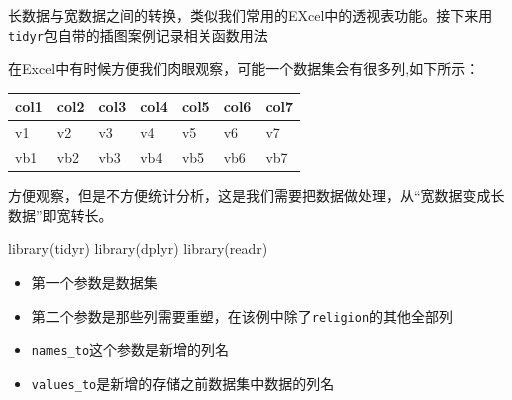 \documentclass[
]{book}
\newenvironment{Shaded}{\begin{snugshade}}{\end{snugshade}}
\newcommand{\AttributeTok}[1]{\textcolor[rgb]{0.77,0.63,0.00}{#1}}
\newcommand{\CommentTok}[1]{\textcolor[rgb]{0.56,0.35,0.01}{\textit{#1}}}
\newcommand{\FunctionTok}[1]{\textcolor[rgb]{0.00,0.00,0.00}{#1}}
\newcommand{\NormalTok}[1]{#1}
\newcommand{\SpecialCharTok}[1]{\textcolor[rgb]{0.00,0.00,0.00}{#1}}
\newcommand{\StringTok}[1]{\textcolor[rgb]{0.31,0.60,0.02}{#1}}
\providecommand{\tightlist}{%
  \setlength{\itemsep}{0pt}\setlength{\parskip}{0pt}}
\begin{document}
长数据与宽数据之间的转换，类似我们常用的EXcel中的透视表功能。接下来用\texttt{tidyr}包自带的插图案例记录相关函数用法

在Excel中有时候方便我们肉眼观察，可能一个数据集会有很多列,如下所示：

\begin{longtable}[]{@{}lllllll@{}}
\toprule
col1 & col2 & col3 & col4 & col5 & col6 & col7 \\
\midrule
\endhead
v1 & v2 & v3 & v4 & v5 & v6 & v7 \\
vb1 & vb2 & vb3 & vb4 & vb5 & vb6 & vb7 \\
\bottomrule
\end{longtable}

方便观察，但是不方便统计分析，这是我们需要把数据做处理，从``宽数据变成长数据''即宽转长。

\begin{Shaded}
\begin{Highlighting}[]
\FunctionTok{library}\NormalTok{(tidyr)}
\FunctionTok{library}\NormalTok{(dplyr)}
\FunctionTok{library}\NormalTok{(readr)}
\end{Highlighting}
\end{Shaded}

\begin{Shaded}
\end{Shaded}

\begin{itemize}
\tightlist
\item
  第一个参数是数据集
\item
  第二个参数是那些列需要重塑，在该例中除了\texttt{religion}的其他全部列
\item
  \texttt{names\_to}这个参数是新增的列名
\item
  \texttt{values\_to}是新增的存储之前数据集中数据的列名
\end{itemize}
\end{document}
